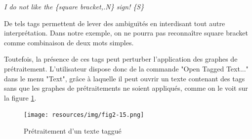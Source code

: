 \bigskip
\textit{I do not like the \{square bracket,.N\} sign! \{S\}}

\bigskip
\noindent De tels tags permettent de lever des ambiguïtés en interdisant tout autre interprétation.
Dans notre exemple, on ne pourra pas reconnaître square bracket comme combinaison de deux mots
simples.


\bigskip
\noindent Toutefois, la présence de ces tags peut perturber l’application des graphes de
prétraitement. L’utilisateur dispose donc de la commande "Open Tagged Text..." dans le menu "Text",
grâce à laquelle il peut ouvrir un texte contenant des tags sans que les graphes de prétraitements
ne soient appliqués, comme on le voit sur la figure \ref{preprocess-tagged-text}.

\bigskip
\begin{figure}[!ht]
\begin{center}
\texttt{[image: resources/img/fig2-15.png]}
\caption{Prétraitement d’un texte taggué\label{preprocess-tagged-text}}
\end{center}
\end{figure}

